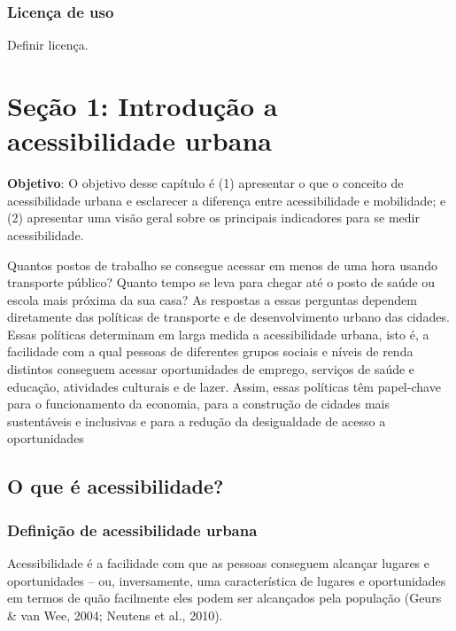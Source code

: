 \documentclass[
  letterpaper,
  DIV=11,
  numbers=noendperiod]{scrreprt}
\begin{document}
\hypertarget{licenuxe7a-de-uso}{%
\section*{Licença de uso}\label{licenuxe7a-de-uso}}

Definir licença.

\part{Seção 1: Introdução a acessibilidade urbana}

\textbf{Objetivo}: O objetivo desse capítulo é (1) apresentar o que o
conceito de acessibilidade urbana e esclarecer a diferença entre
acessibilidade e mobilidade; e (2) apresentar uma visão geral sobre os
principais indicadores para se medir acessibilidade.

Quantos postos de trabalho se consegue acessar em menos de uma hora
usando transporte público? Quanto tempo se leva para chegar até o posto
de saúde ou escola mais próxima da sua casa? As respostas a essas
perguntas dependem diretamente das políticas de transporte e de
desenvolvimento urbano das cidades. Essas políticas determinam em larga
medida a acessibilidade urbana, isto é, a facilidade com a qual pessoas
de diferentes grupos sociais e níveis de renda distintos conseguem
acessar oportunidades de emprego, serviços de saúde e educação,
atividades culturais e de lazer. Assim, essas políticas têm papel-chave
para o funcionamento da economia, para a construção de cidades mais
sustentáveis e inclusivas e para a redução da desigualdade de acesso a
oportunidades

\hypertarget{o-que-uxe9-acessibilidade}{%
\chapter{O que é acessibilidade?}\label{o-que-uxe9-acessibilidade}}

\hypertarget{definiuxe7uxe3o-de-acessibilidade-urbana}{%
\section{Definição de acessibilidade
urbana}\label{definiuxe7uxe3o-de-acessibilidade-urbana}}

Acessibilidade é a facilidade com que as pessoas conseguem alcançar
lugares e oportunidades -- ou, inversamente, uma característica de
lugares e oportunidades em termos de quão facilmente eles podem ser
alcançados pela população (Geurs \& van Wee, 2004; Neutens et al.,
2010).
\end{document}
